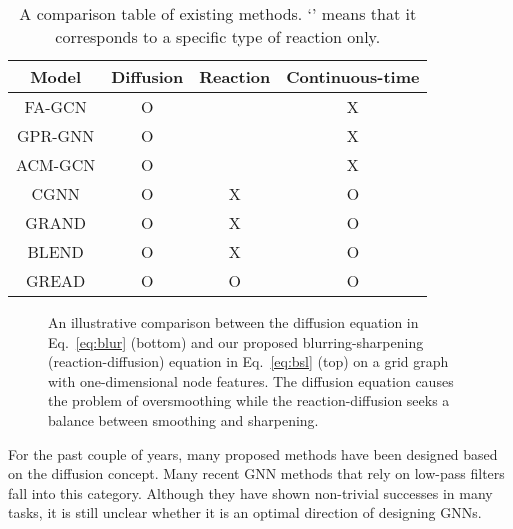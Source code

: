 \documentclass{article}
\theoremstyle{plain}
\theoremstyle{definition}
\theoremstyle{remark}
\begin{document}
\begin{table}[t]
\small
    \centering
    \setlength{\tabcolsep}{3pt}
    \caption{A comparison table of existing methods. `' means that it corresponds to a specific type of reaction only.}
    \begin{tabular}{cccc}\toprule
        Model     & Diffusion & Reaction    & Continuous-time\\\midrule
FA-GCN    & O         &  & X \\
        GPR-GNN   & O         &  & X \\
        ACM-GCN   & O         &  & X \\
        CGNN      & O         & X           & O \\
GRAND     & O         & X           & O \\
        BLEND     & O         & X           & O \\\midrule
        GREAD     & O         & O           & O \\
        \bottomrule
    \end{tabular}
    \label{tab:comp}
\end{table}

\begin{figure}[!t]
    \centering
    \caption{An illustrative comparison between the diffusion equation in Eq.~\eqref{eq:blur} (bottom) and our proposed blurring-sharpening (reaction-diffusion) equation in Eq.~\eqref{eq:bsl} (top) on a grid graph with one-dimensional node features. The diffusion equation causes the problem of oversmoothing while the reaction-diffusion seeks a balance between smoothing and sharpening.}
    \label{fig:teaser}
\end{figure}

For the past couple of years, many proposed methods have been designed based on the diffusion concept. Many recent GNN methods that rely on low-pass filters fall into this category. Although they have shown non-trivial successes in many tasks, it is still unclear whether it is an optimal direction of designing GNNs.
\end{document}
